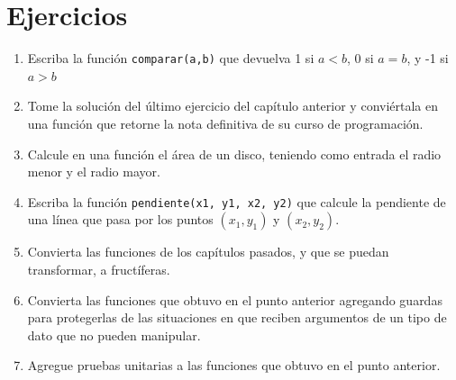 \section{Ejercicios}
\begin{enumerate}
\item Escriba la función \verb+comparar(a,b)+ que devuelva 1 si $a<b$,
0 si $a=b$, y -1 si $a>b$
\item Tome la solución del último ejercicio del capítulo anterior y conviértala
en una función que retorne la nota definitiva de su curso de programación.
\item Calcule en una función el área de un disco, teniendo como entrada
el radio menor y el radio mayor.
\item Escriba la función \verb+pendiente(x1, y1, x2, y2)+ que calcule la
pendiente de una línea que pasa por los puntos $(x_{1},y_{1})$ y
$(x_{2},y_{2})$.
\item Convierta las funciones de los capítulos pasados, y que se puedan
transformar, a fructíferas.
\item Convierta las funciones que obtuvo en el punto anterior agregando
guardas para protegerlas de las situaciones en que reciben argumentos
de un tipo de dato que no pueden manipular.
\item Agregue pruebas unitarias a las funciones que obtuvo en el punto anterior.
\end{enumerate}

